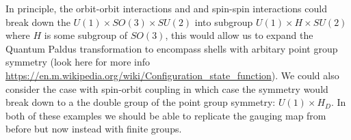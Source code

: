 \documentclass{article}
\begin{document}
In principle, the orbit-orbit interactions and and spin-spin interactions could break down the $U(1) \times SO(3) \times SU(2)$ into subgroup $U(1) \times H \times SU(2)$ where $H$ is some subgroup of $SO(3)$, this would allow us to expand the Quantum Paldus transformation to encompass shells with arbitary point group symmetry (look here for more info \url{https://en.m.wikipedia.org/wiki/Configuration_state_function}). We could also consider the case with spin-orbit coupling in which case the symmetry would break down to a the double group of the point group symmetry: $U(1) \times H_D$. In both of these examples we should be able to replicate the gauging map from before but now instead with finite groups.



\end{document}
